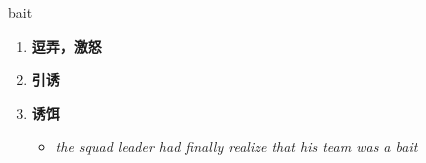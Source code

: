 
\begin{frame}
{\huge bait}
\begin{center}
\begin{enumerate}\Large
  \item \textbf{逗弄，激怒}
  \item \textbf{引诱}
  \item \textbf{诱饵}
  \begin{itemize}
    \item \em{\Large{the squad leader had finally realize that his team was a bait}}
  \end{itemize}
\end{enumerate}
\end{center}
\end{frame}
